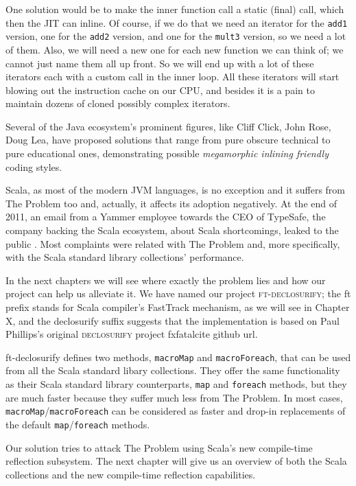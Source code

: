 One solution  would be to make the inner function call a static (final)
call, which then the JIT can inline. Of course, if we do that we need an
iterator for the \texttt{add1} version, one for the \texttt{add2} version, and one for the
\texttt{mult3} version, so we need a lot of them. Also, we will need a new one for
each new function we can think of; we cannot just name them all up front.  So we
will end up with a lot of these iterators each with a custom call in the inner
loop. All these iterators will start blowing out the instruction cache on our
CPU, and besides it is a pain to maintain dozens of cloned possibly complex
iterators.

Several of the Java ecosystem's prominent figures, like Cliff Click, John Rose,
Doug Lea, have proposed solutions that range from pure obscure technical to pure
educational ones, demonstrating possible \emph{megamorphic inlining friendly}
coding styles.

Scala, as most of the modern JVM languages, is no exception and it suffers from
The Problem too and, actually, it affects its adoption negatively. At the end of
2011, an email from a Yammer employee towards the CEO of TypeSafe, the company
backing the Scala ecosystem, about Scala shortcomings, leaked to the public
. Most complaints were
related with The Problem and, more specifically, with the Scala standard
library collections' performance. 

In the next chapters we will see where exactly the problem lies and how
our project can help us alleviate it. We have named our project
\textsc{ft-declosurify}; the ft prefix stands for Scala compiler's FastTrack
mechanism, as we will see in Chapter X, and the declosurify suffix suggests that
the implementation is based on Paul Phillips's original \textsc{declosurify} project
fxfatal{cite github url}. 

ft-declosurify defines two methods, \texttt{macroMap} and \texttt{macroForeach}, that can be used
from all the Scala standard libary collections. They offer the same
functionality as their Scala standard library counterparts, \texttt{map} and \texttt{foreach}
methods, but they are much faster because they suffer much less from The
Problem. In most cases, \texttt{macroMap}/\texttt{macroForeach} can be considered as faster and
drop-in replacements of the default \texttt{map}/\texttt{foreach} methods.

Our solution tries to attack The Problem using Scala's new compile-time
reflection subsystem. The next chapter will give us an overview of both the
Scala collections and the new compile-time reflection capabilities.
